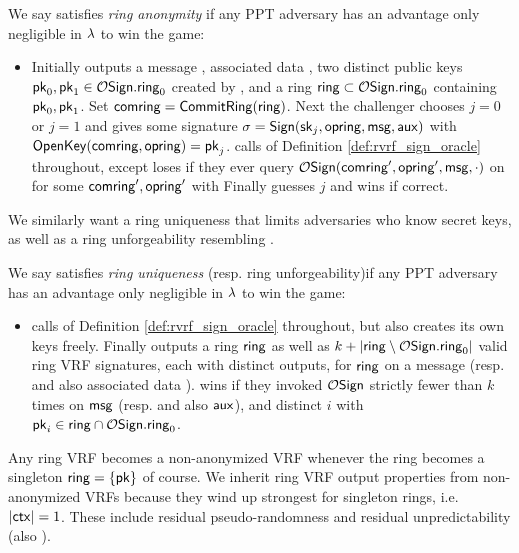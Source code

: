 \begin{definition}
We say \rVRF satisfies {\em ring anonymity} if
any PPT adversary \adv has an advantage only
 negligible in $\lambda$ to win the game:
\begin{itemize}
\item[]
 Initially \adv outputs a message \msg, associated data \aux,
 two distinct public keys $\mathsf{pk}_0,\mathsf{pk}_1 \in \mathcal{O}\mathsf{Sign}.\mathsf{ring}_0$ created by ,
 and a ring $\mathsf{ring} \subset \mathcal{O}\mathsf{Sign}.\mathsf{ring}_0$ containing $\mathsf{pk}_0,\mathsf{pk}_1$.
 Set $\mathsf{comring} = {\mathsf{CommitRing}}(\mathsf{ring})$.
 Next the challenger chooses $j=0$ or $j=1$ and gives
  \adv some signature $\sigma = {\mathsf{Sign}}(\mathsf{sk}_j,\mathsf{opring},\mathsf{msg},\mathsf{aux})$ with ${\mathsf{OpenKey}}(\mathsf{comring},\mathsf{opring}) = \mathsf{pk}_j$.
 \adv calls  of Definition \ref{def:rvrf_sign_oracle} throughout,
 except \adv loses if they ever query $\mathcal{O}\mathsf{Sign}(\mathsf{comring}',\mathsf{opring}',\mathsf{msg},\cdot)$
 on \msg for some $\mathsf{comring}',\mathsf{opring}'$ with
 \def\tmp{\OpenKey(\comring',\openring') \in \{ \pk_0, \pk_1 \}}
 \eprint{$\tmp$.}{$$ \mathperiod $$}
 Finally \adv guesses $j$ and wins if correct.
\end{itemize}
\end{definition}

We similarly want a ring uniqueness that limits adversaries who know secret keys,
as well as a ring unforgeability resembling \cite[pp. 7 Def. 7]{cryptoeprint:2005:304}. %

\begin{definition}
We say \rVRF satisfies {\em ring uniqueness} (resp. ring unforgeability)if
any PPT adversary \adv has an advantage only
 negligible in $\lambda$ to win the game:
\begin{itemize}
\item[]
 \adv calls  of Definition \ref{def:rvrf_sign_oracle} throughout,
 but also creates its own keys freely.
 Finally \adv outputs a ring $\mathsf{ring}$ as well as
 $k + |\mathsf{ring} \setminus \mathcal{O}\mathsf{Sign}.\mathsf{ring}_0|$ valid ring VRF signatures,
  each with distinct outputs,    %
 for $\mathsf{ring}$ on a message \msg (resp. and also associated data \aux).
 \adv wins if they invoked $\mathcal{O}\mathsf{Sign}$ strictly fewer than $k$ times
 on $\mathsf{msg}$ (resp. and also $\mathsf{aux}$), and
  distinct $i$ with $\mathsf{pk}_i \in \mathsf{ring} \cap \mathcal{O}\mathsf{Sign}.\mathsf{ring}_0$.
\end{itemize}
\end{definition}
 
Any ring VRF becomes a non-anonymized VRF whenever
 the ring becomes a singleton $\mathsf{ring} = \{ \mathsf{pk} \}$ of course.
We inherit ring VRF output properties from non-anonymized VRFs
because they wind up strongest for singleton rings, i.e. $|\mathsf{ctx}| = 1$.
These include 
 residual pseudo-randomness \cite[Def. VRF (3) \S3.2, pp. 4]{vrf_micali} and
 residual unpredictability \cite[Def. VUF (3) \S3.2, pp. 5]{vrf_micali}
  (also \cite[Def. 4, pp. 8]{agg_dkg}).





